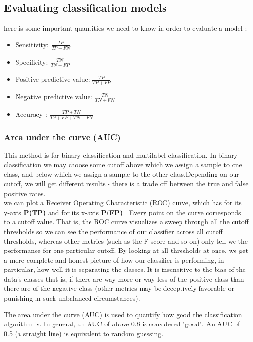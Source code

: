 \subsection{Evaluating classification models}\label{eva}

here is some important quantities we need to know in order to evaluate a model :
\begin{itemize}
\item Sensitivity: $ \frac{TP}{TP+FN}$ 
\item Specificity: $\frac{TN}{TN+FP}$
\item Positive predictive value:  $\frac{TP}{TP+FP}$ 
\item Negative predictive value: $\frac{TN}{TN+FN}$
\item Accuracy : $\frac{TP+TN}{TP+FP+TN+FN}$
\end{itemize}

\subsubsection{Area under the curve (AUC)}

This method is for binary classification and multilabel classification. In binary classification we may choose some cutoff above which we assign a sample to one class, and below which we assign a sample to the other class.Depending on our cutoff, we will get different results - there is a trade off between the true and false positive rates.\\
we can plot a Receiver Operating Characteristic (ROC) curve, which has for its y-axis \textbf{P(TP)}  and for its x-axis \textbf{P(FP)} . Every point on the curve corresponds to a cutoff value. That is, the ROC curve visualizes a sweep through all the cutoff thresholds so we can see the performance of our classifier across all cutoff thresholds, whereas other metrics (such as the F-score and so on) only tell we the performance for one particular cutoff. By looking at all thresholds at once, we get a more complete and honest picture of how our classifier is performing, in particular, how well it is separating the classes. It is insensitive to the bias of the data's classes  that is, if there are way more or way less of the positive class than there are of the negative class (other metrics may be deceptively favorable or punishing in such unbalanced circumstances).

The area under the curve (AUC) is used to quantify how good the classification algorithm is. In general, an AUC of above 0.8 is considered "good". An AUC of 0.5 (a straight line) is equivalent to random guessing.  


